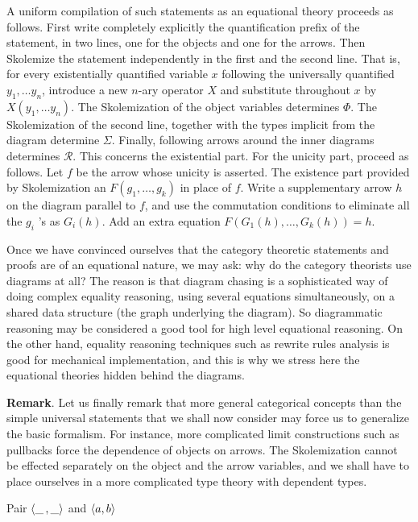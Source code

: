 A uniform compilation of such statements as an equational theory proceeds as follows.
First write completely explicitly the quantification prefix of the statement, in two
lines, one for the objects and one for the arrows. Then Skolemize the statement
independently in the first and the second line. That is, for every existentially
quantified variable $x$ following the universally quantified $y_1, \ldots y_n$, introduce
a new $n$-ary operator $X$ and substitute throughout $x$ by $X\left(y_1, \ldots
y_n\right)$. The Skolemization of the object variables determines $\Phi$. The
Skolemization of the second line, together with the types implicit from the diagram
determine $\Sigma$. Finally, following arrows around the inner diagrams determines
$\mathcal{R}$. This concerns the existential part. For the unicity part, proceed as
follows. Let $f$ be the arrow whose unicity is asserted. The existence part provided by
Skolemization an $F\left(g_1, \ldots, g_k\right)$ in place of $f$. Write a supplementary
arrow $h$ on the diagram parallel to $f$, and use the commutation conditions to eliminate
all the $g_i$ 's as $G_i(h)$. Add an extra equation $F\left(G_1(h), \ldots,
G_k(h)\right)=h$.

Once we have convinced ourselves that the category theoretic statements and proofs are of
an equational nature, we may ask: why do the category theorists use diagrams at all? The
reason is that diagram chasing is a sophisticated way of doing complex equality reasoning,
using several equations simultaneously, on a shared data structure (the graph underlying
the diagram). So diagrammatic reasoning may be considered a good tool for high level
equational reasoning. On the other hand, equality reasoning techniques such as rewrite
rules analysis is good for mechanical implementation, and this is why we stress here the
equational theories hidden behind the diagrams. 

\bigskip\noindent
{\bf Remark}. Let us finally remark that more
general categorical concepts than the simple universal statements that we shall now
consider may force us to generalize the basic formalism. For instance, more complicated
limit constructions such as pullbacks force the dependence of objects on arrows. The
Skolemization cannot be eﬀected separately on the object and the arrow variables, and we
shall have to place ourselves in a more complicated type theory with dependent types.

Pair $\langle \_\,, \_ \rangle$ and $\langle a, b \rangle$










